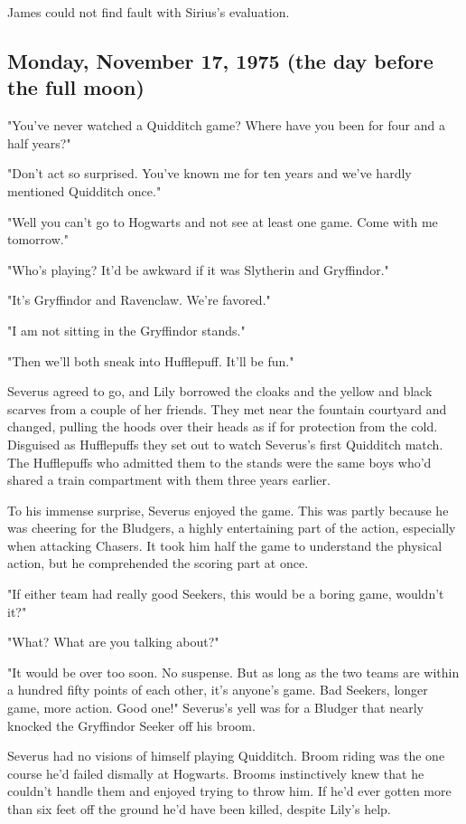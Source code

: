 James could not find fault with Sirius's evaluation.

\subsection{Monday, November 17, 1975 (the day before the full moon)}

"You've never watched a Quidditch game? Where have you been for four and a half years?"

"Don't act so surprised. You've known me for ten years and we've hardly mentioned Quidditch once."

"Well you can't go to Hogwarts and not see at least one game. Come with me tomorrow."

"Who's playing? It'd be awkward if it was Slytherin and Gryffindor."

"It's Gryffindor and Ravenclaw. We're favored."

"I am not sitting in the Gryffindor stands."

"Then we'll both sneak into Hufflepuff. It'll be fun."

Severus agreed to go, and Lily borrowed the cloaks and the yellow and black scarves from a couple of her friends. They met near the fountain courtyard and changed, pulling the hoods over their heads as if for protection from the cold. Disguised as Hufflepuffs they set out to watch Severus's first Quidditch match. The Hufflepuffs who admitted them to the stands were the same boys who'd shared a train compartment with them three years earlier.

To his immense surprise, Severus enjoyed the game. This was partly because he was cheering for the Bludgers, a highly entertaining part of the action, especially when attacking Chasers. It took him half the game to understand the physical action, but he comprehended the scoring part at once.

"If either team had really good Seekers, this would be a boring game, wouldn't it?"

"What? What are you talking about?"

"It would be over too soon. No suspense. But as long as the two teams are within a hundred fifty points of each other, it's anyone's game. Bad Seekers, longer game, more action. Good one!" Severus's yell was for a Bludger that nearly knocked the Gryffindor Seeker off his broom.

Severus had no visions of himself playing Quidditch. Broom riding was the one course he'd failed dismally at Hogwarts. Brooms instinctively knew that he couldn't handle them and enjoyed trying to throw him. If he'd ever gotten more than six feet off the ground he'd have been killed, despite Lily's help.

